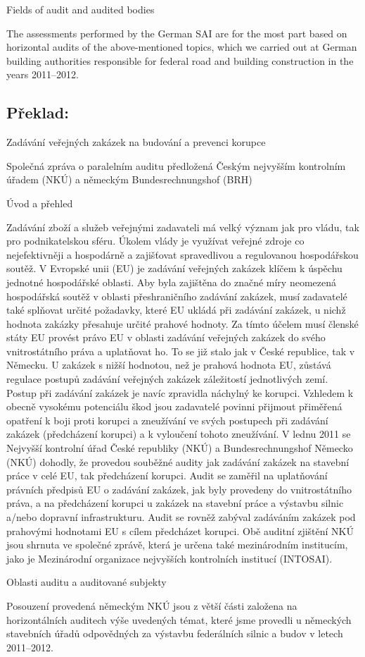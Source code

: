 \documentclass[10pt]{article}
\begin{document}
Fields of audit and audited bodies

The assessments performed by the German SAI are for the most part based on horizontal audits of the above-mentioned topics, which we carried out at German building authorities responsible for federal road and building construction in the years 2011–2012.


\pagebreak

\subsection*{Překlad:}



Zadávání veřejných zakázek na budování a prevenci korupce



Společná zpráva o paralelním auditu předložená Českým nejvyšším kontrolním úřadem (NKÚ) a německým Bundesrechnungshof (BRH)



Úvod a přehled

Zadávání zboží a služeb veřejnými zadavateli má velký význam jak pro vládu, tak pro podnikatelskou sféru.
Úkolem vlády je využívat veřejné zdroje co nejefektivněji a hospodárně a zajišťovat spravedlivou a regulovanou hospodářskou soutěž.
V Evropské unii (EU) je zadávání veřejných zakázek klíčem k úspěchu jednotné hospodářské oblasti.
Aby byla zajištěna do značné míry neomezená hospodářská soutěž v oblasti přeshraničního zadávání zakázek, musí zadavatelé také splňovat určité požadavky, které EU ukládá při zadávání zakázek, u nichž hodnota zakázky přesahuje určité prahové hodnoty.
Za tímto účelem musí členské státy EU provést právo EU v oblasti zadávání veřejných zakázek do svého vnitrostátního práva a uplatňovat ho.
To se již stalo jak v České republice, tak v Německu.
U zakázek s nižší hodnotou, než je prahová hodnota EU, zůstává regulace postupů zadávání veřejných zakázek záležitostí jednotlivých zemí.
Postup při zadávání zakázek je navíc zpravidla náchylný ke korupci.
Vzhledem k obecně vysokému potenciálu škod jsou zadavatelé povinni přijmout přiměřená opatření k boji proti korupci a zneužívání ve svých postupech při zadávání zakázek (předcházení korupci) a k vyloučení tohoto zneužívání.
V lednu 2011 se Nejvyšší kontrolní úřad České republiky (NKÚ) a Bundesrechnungshof Německo (NKÚ) dohodly, že provedou souběžné audity jak zadávání zakázek na stavební práce v celé EU, tak předcházení korupci.
Audit se zaměřil na uplatňování právních předpisů EU o zadávání zakázek, jak byly provedeny do vnitrostátního práva, a na předcházení korupci u zakázek na stavební práce a výstavbu silnic a/nebo dopravní infrastrukturu.
Audit se rovněž zabýval zadáváním zakázek pod prahovými hodnotami EU s cílem předcházet korupci.
Obě auditní zjištění NKÚ jsou shrnuta ve společné zprávě, která je určena také mezinárodním institucím, jako je Mezinárodní organizace nejvyšších kontrolních institucí (INTOSAI).


Oblasti auditu a auditované subjekty

Posouzení provedená německým NKÚ jsou z větší části založena na horizontálních auditech výše uvedených témat, které jsme provedli u německých stavebních úřadů odpovědných za výstavbu federálních silnic a budov v letech 2011–2012.
\end{document}
